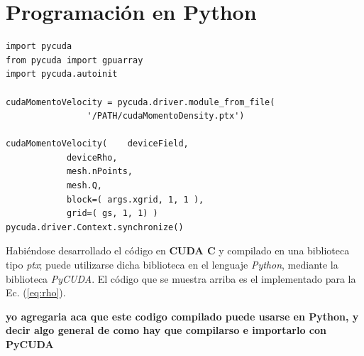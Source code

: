 \section{Programación en Python}
{\footnotesize
	\begin{frame}{}
		\begin{lstlisting}[frame=single]
import pycuda
from pycuda import gpuarray
import pycuda.autoinit
		
cudaMomentoVelocity = pycuda.driver.module_from_file(
				'/PATH/cudaMomentoDensity.ptx')		
			
cudaMomentoVelocity(	deviceField,
			deviceRho,
			mesh.nPoints,
			mesh.Q,
			block=( args.xgrid, 1, 1 ),
			grid=( gs, 1, 1) )     			    
pycuda.driver.Context.synchronize()
		\end{lstlisting}
		
	\end{frame}
}

Habiéndose desarrollado el código en \textbf{CUDA C} y compilado en una biblioteca tipo \textit{ptx}; puede utilizarse dicha biblioteca en el lenguaje \textit{Python}, mediante la biblioteca \textit{PyCUDA}. El código que se muestra arriba es el implementado para la Ec. (\ref{eq:rho}).

\textbf{yo agregaria aca que este codigo compilado puede usarse en Python, y decir algo general de como hay que compilarso e importarlo con PyCUDA}

